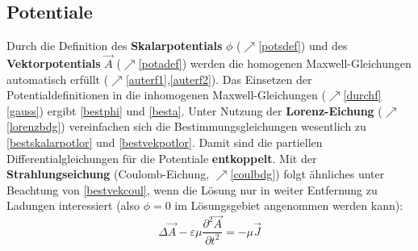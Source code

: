 \subsection{Potentiale}
		   Durch die Definition des \textbf{Skalarpotentials}  \(\phi\) ($\nearrow$\ref{potsdef}) und des \textbf{Vektorpotentials} \( \vec{A}\) ($\nearrow$\ref{potadef}) werden die homogenen Maxwell-Gleichungen automatisch erfüllt ($\nearrow$\ref{auterf1},\ref{auterf2}). Das Einsetzen der Potentialdefinitionen in die inhomogenen Maxwell-Gleichungen ($\nearrow$\ref{durchf}\ref{gauss}) ergibt \ref{bestphi} und \ref{besta}.
		   Unter Nutzung der \textbf{Lorenz-Eichung} ($\nearrow$\ref{lorenzbdg}) vereinfachen sich die Bestimmungsgleichungen wesentlich zu \ref{bestskalarpotlor} und \ref{bestvekpotlor}. Damit sind die partiellen Differentialgleichungen für die Potentiale \textbf{entkoppelt}. Mit der \textbf{Strahlungseichung} (Coulomb-Eichung, $\nearrow$\ref{coulbdg}) folgt ähnliches unter Beachtung von \ref{bestvekcoul}, wenn die Lösung nur in weiter Entfernung zu Ladungen interessiert (also \( \phi = 0 \) im Lösungsgebiet angenommen werden kann):
		        \begin{equation}
			        \boxed{\Delta  \vec{A}-\varepsilon\mu\frac{\partial^2 \vec{A}}{\partial t^2}=-\mu \vec{J}}
		        \end{equation}
